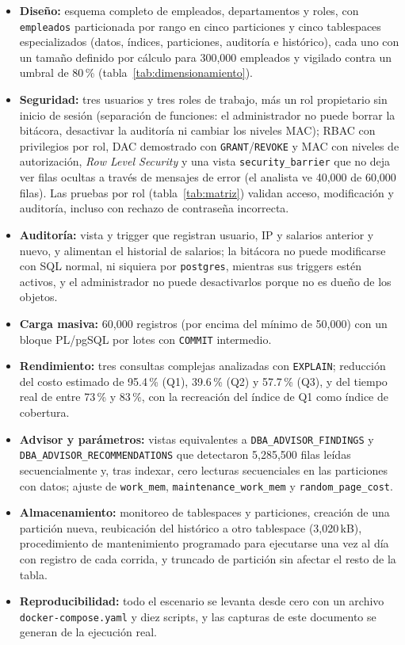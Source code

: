 \documentclass[12pt,a4paper]{article}
\begin{document}
\begin{itemize}
    \item \textbf{Diseño:} esquema completo de empleados, departamentos y roles, con \texttt{empleados} particionada por rango en cinco particiones y cinco tablespaces especializados (datos, índices, particiones, auditoría e histórico), cada uno con un tamaño definido por cálculo para 300,000 empleados y vigilado contra un umbral de 80\,\% (tabla~\ref{tab:dimensionamiento}).
    \item \textbf{Seguridad:} tres usuarios y tres roles de trabajo, más un rol propietario sin inicio de sesión (separación de funciones: el administrador no puede borrar la bitácora, desactivar la auditoría ni cambiar los niveles MAC); RBAC con privilegios por rol, DAC demostrado con \texttt{GRANT}/\texttt{REVOKE} y MAC con niveles de autorización, \textit{Row Level Security} y una vista \texttt{security\_\allowbreak{}barrier} que no deja ver filas ocultas a través de mensajes de error (el analista ve 40,000 de 60,000 filas). Las pruebas por rol (tabla~\ref{tab:matriz}) validan acceso, modificación y auditoría, incluso con rechazo de contraseña incorrecta.
    \item \textbf{Auditoría:} vista y trigger que registran usuario, IP y salarios anterior y nuevo, y alimentan el historial de salarios; la bitácora no puede modificarse con SQL normal, ni siquiera por \texttt{postgres}, mientras sus triggers estén activos, y el administrador no puede desactivarlos porque no es dueño de los objetos.
    \item \textbf{Carga masiva:} 60,000 registros (por encima del mínimo de 50,000) con un bloque PL/pgSQL por lotes con \texttt{COMMIT} intermedio.
    \item \textbf{Rendimiento:} tres consultas complejas analizadas con \texttt{EXPLAIN}; reducción del costo estimado de 95.4\,\% (Q1), 39.6\,\% (Q2) y 57.7\,\% (Q3), y del tiempo real de entre 73\,\% y 83\,\%, con la recreación del índice de Q1 como índice de cobertura.
    \item \textbf{Advisor y parámetros:} vistas equivalentes a \texttt{DBA\_\allowbreak{}ADVISOR\_\allowbreak{}FINDINGS} y \texttt{DBA\_\allowbreak{}ADVISOR\_\allowbreak{}RECOMMENDATIONS} que detectaron 5,285,500 filas leídas secuencialmente y, tras indexar, cero lecturas secuenciales en las particiones con datos; ajuste de \texttt{work\_\allowbreak{}mem}, \texttt{maintenance\_\allowbreak{}work\_\allowbreak{}mem} y \texttt{random\_\allowbreak{}page\_\allowbreak{}cost}.
    \item \textbf{Almacenamiento:} monitoreo de tablespaces y particiones, creación de una partición nueva, reubicación del histórico a otro tablespace (3,020\,kB), procedimiento de mantenimiento programado para ejecutarse una vez al día con registro de cada corrida, y truncado de partición sin afectar el resto de la tabla.
    \item \textbf{Reproducibilidad:} todo el escenario se levanta desde cero con un archivo \texttt{docker-compose\allowbreak{}.yaml} y diez scripts, y las capturas de este documento se generan de la ejecución real.
\end{itemize}
\end{document}
